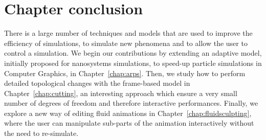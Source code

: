 \section{Chapter conclusion}
There is a large number of techniques and models that are used to improve the efficiency of simulations, to simulate new phenomena and to allow the user to control a simulation.
We begin our contributions by extending an adaptive model, initially proposed for nanosystems simulations, to speed-up particle simulations in Computer Graphics, in Chapter~\ref{chap:arps}.
Then, we study how to perform detailed topological changes with the frame-based model in Chapter~\ref{chap:cutting}, an interesting approach which ensure a very small number of degrees of freedom and therefore interactive performances.
Finally, we explore a new way of editing fluid animations in Chapter~\ref{chap:fluidsculpting}, where the user can manipulate sub-parts of the animation interactively without the need to re-simulate.
